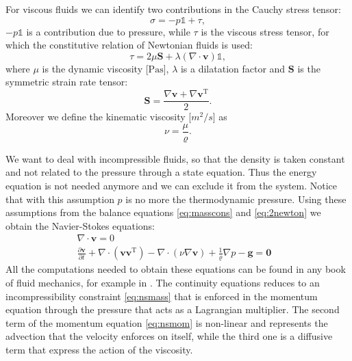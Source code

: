 For viscous fluids we can identify two contributions in the Cauchy stress 
tensor:
\begin{equation}
\sigma = -p\mathbb{1} + \tau,
\end{equation}
$-p\mathbb{1}$ is a contribution due to pressure, while $\tau$ is 
the viscous stress tensor, for which the constitutive relation of Newtonian 
fluids is used:
\begin{equation}
\tau = 2\mu \mathbf{S} + 
\lambda (\nabla \cdot \mathbf{v}) \mathbb{1},
\end{equation}
where $\mu$ is the dynamic viscosity [$\si{\pascal\second}$], $\lambda$ 
is a dilatation factor and $\mathbf{S}$ is the symmetric strain rate tensor:
\begin{equation*}
\mathbf{S} = \frac{\nabla \mathbf{v} + \nabla \mathbf{v}^\mathrm{T}}{2}.
\end{equation*} 
Moreover we define the kinematic viscosity 
[$\si{m^2/s}$] as
\begin{equation}
\nu = \frac{\mu}{\varrho}.
\end{equation}

We want to deal with incompressible fluids, so that the density is taken 
constant and not related to the pressure through a state equation. Thus the 
energy equation is not needed anymore and we can exclude it from the system. 
Notice that with this assumption $p$ is no more the thermodynamic pressure.
Using these assumptions from the balance equations 
\eqref{eq:masscons} and \eqref{eq:2newton} we obtain the Navier-Stokes 
equations:
\begin{align}
\label{eq:nsmass} \nabla \cdot \mathbf{v} = 0&\\
\label{eq:nsmom} \frac{\partial \mathbf{v}}{\partial t} + \nabla 
\cdot (\mathbf{v} \mathbf{v}^\mathrm{T}) - \nabla \cdot (\nu \nabla 
\mathbf{v}) + \frac{1}{\varrho}\nabla p  -\mathbf{g} = \mathbf{0}&
\end{align}
All the computations needed to obtain these equations can be found in any book 
of fluid mechanics, for example in \cite{main:vermal}. The continuity equations 
reduces to an incompressibility constraint \eqref{eq:nsmass} that is enforced 
in the momentum equation through the pressure that acts as a Lagrangian 
multiplier. The second term of the momentum equation \eqref{eq:nsmom} is 
non-linear and represents the advection that the velocity enforces on itself, 
while the third one is a diffusive term that express the action of the 
viscosity.
%
